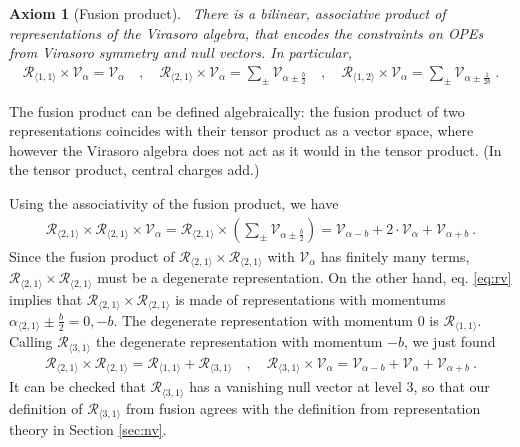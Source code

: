 \documentclass[12pt, a4paper]{article}
\theoremstyle{break}
\newtheorem{hyp}[exo]{Axiom}
\begin{document}
\begin{hyp}[Fusion product]
 ~\label{hyp:fus}
 There is a bilinear, associative product of representations of the Virasoro algebra, that encodes the constraints on OPEs from Virasoro symmetry and null vectors. In particular,
 \begin{align}
  \mathcal{R}_{\langle 1,1\rangle}\times \mathcal V_\alpha = \mathcal V_\alpha \quad , \quad 
  \mathcal{R}_{\langle 2,1\rangle}\times \mathcal V_\alpha = \sum_\pm \mathcal V_{\alpha\pm \frac{b}{2}}\quad , \quad  
  \mathcal{R}_{\langle 1,2\rangle}\times \mathcal V_\alpha = \sum_\pm \mathcal V_{\alpha\pm \frac{1}{2b}}\ .
  \label{eq:rv}
 \end{align}
\end{hyp}
The fusion product can be defined algebraically: the fusion product of two representations coincides with their tensor product as a vector space, where however the Virasoro algebra does not act as it would in the tensor product. (In the tensor product, central charges add.) 

Using the associativity of the fusion product, we have 
\begin{align}
 \mathcal{R}_{\langle 2,1\rangle}\times \mathcal{R}_{\langle 2,1\rangle}  \times \mathcal V_\alpha  =
\mathcal{R}_{\langle 2,1\rangle}\times  \left(\sum_\pm \mathcal V_{\alpha\pm \frac{b}{2}}\right) =
\mathcal V_{\alpha - b} + 2\cdot \mathcal V_\alpha + \mathcal V_{\alpha + b} \ .
\end{align}
Since the fusion product of $\mathcal{R}_{\langle 2,1\rangle}\times \mathcal{R}_{\langle 2,1\rangle} $ with $\mathcal V_\alpha$ has finitely many terms, $\mathcal{R}_{\langle 2,1\rangle}\times \mathcal{R}_{\langle 2,1\rangle} $
must be a degenerate representation. 
On the other hand, eq. \eqref{eq:rv} implies that $\mathcal{R}_{\langle 2,1\rangle}\times \mathcal{R}_{\langle 2,1\rangle} $ is made of representations with momentums $\alpha_{\langle 2,1\rangle} \pm \frac{b}{2} = 0,-b$. The degenerate representation with momentum $0$ is $\mathcal{R}_{\langle 1,1\rangle}$. Calling $\mathcal{R}_{\langle 3,1\rangle}$ the degenerate representation with momentum $-b$, we just found
\begin{align}
 \mathcal{R}_{\langle 2,1\rangle}\times \mathcal{R}_{\langle 2,1\rangle} = \mathcal{R}_{\langle 1,1\rangle} + \mathcal{R}_{\langle 3,1\rangle} \quad , \quad \mathcal{R}_{\langle 3,1\rangle} \times \mathcal V_\alpha = \mathcal V_{\alpha - b} + \mathcal V_\alpha + \mathcal V_{\alpha + b}\ .
\end{align}
It can be checked that $\mathcal{R}_{\langle 3,1\rangle}$ has a vanishing null vector at level $3$, so that our definition of $\mathcal{R}_{\langle 3,1\rangle}$ from fusion agrees with the definition from representation theory in Section \ref{sec:nv}.
\end{document}
